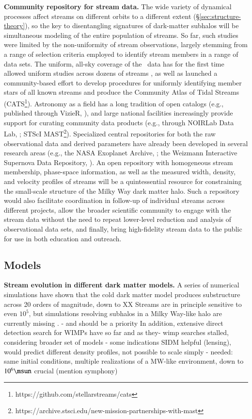 \documentclass[final,5p,times,twocolumn,authoryear]{elsarticle}
\begin{document}
\textbf{Community repository for stream data.}
The wide variety of dynamical processes affect streams on different orbits to a different extent (\S\ref{sec:structure-theory}), so the key to disentangling signatures of dark-matter subhalos will be simultaneous modeling of the entire population of streams.
So far, such studies were limited by the non-uniformity of stream observations, largely stemming from a range of selection criteria employed to identify stream members in a range of data sets.
The uniform, all-sky coverage of the \gaia\ data has for the first time allowed uniform studies across dozens of streams \citep[e.g.,][]{bonaca:2021,malhan:2022,ibata:2023}, as well as launched a community-based effort to develop procedures for uniformly identifying member stars of all known streams and produce the Community Atlas of Tidal Streams (CATS\footnote{https://github.com/stellarstreams/cats}).
Astronomy as a field has a long tradition of open catalogs (e.g., published through VizieR, \citealt{ochsenbein:2000}), and large national facilities increasingly provide support for curating community data products (e.g., through NOIRLab Data Lab, \citealt{nikutta:2020}; STScI MAST\footnote{https://archive.stsci.edu/new-mission-partnerships-with-mast}).
Specialized central repositories for both the raw observational data and derived parameters have already been developed in several research areas (e.g., the NASA Exoplanet Archive, \citealt{akeson:2013}; the Weizmann Interactive Supernova Data Repository, \citealt{yaron:2012}).
An open repository with homogeneous stream membership, phase-space information, as well as the measured width, density, and velocity profiles of streams will be a quintessential resource for constraining the small-scale structure of the Milky Way dark matter halo.
Such a repository would also facilitate coordination in follow-up of individual streams across different projects, allow the broader scientific community to engage with the stream data without the need to repeat lower-level reduction and analysis of observational data sets, and finally, bring high-fidelity stream data to the public for use in both education and outreach.


\subsection{Models}
\textbf{Stream evolution in different dark matter models.}
A series of numerical simulations have shown that the cold dark matter model produces substructure across 20 orders of magnitude, down to XX
Streams are in principle sensitive to even $10^5$, but simulations resolving subhalos in a Milky Way-like halo are currently missing \citep[][]{}.
- and should be a priority
In addition, extensive direct detection search for WIMPs have so far and as they- wimp searches stalled, considering broader set of models
- some indications SIDM helpful (lensing), would predict different density profiles, not possible to scale simply
- needed: same initial conditions, multiple realizations of a MW-like environment, down to $10^6\unit{\msun}$ crucial (mention symphony)
\end{document}
